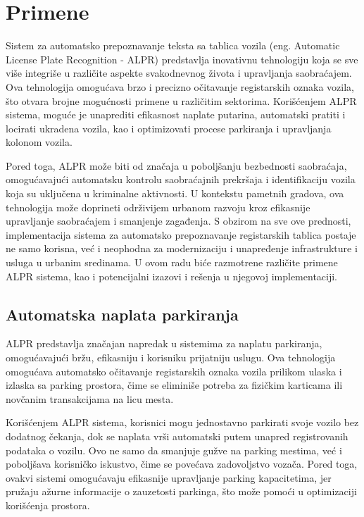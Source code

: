 \documentclass[a4paper,12pt]{article}
\begin{document}
	\section{Primene}
	Sistem za automatsko prepoznavanje teksta sa tablica vozila (eng. Automatic License Plate Recognition - ALPR) predstavlja inovativnu tehnologiju koja se sve više integriše u različite aspekte svakodnevnog života i upravljanja saobraćajem. Ova tehnologija omogućava brzo i precizno očitavanje registarskih oznaka vozila, što otvara brojne mogućnosti primene u različitim sektorima. Korišćenjem ALPR sistema, moguće je unaprediti efikasnost naplate putarina, automatski pratiti i locirati ukradena vozila, kao i optimizovati procese parkiranja i upravljanja kolonom vozila.
	
	Pored toga, ALPR može biti od značaja u poboljšanju bezbednosti saobraćaja, omogućavajući automatsku kontrolu saobraćajnih prekršaja i identifikaciju vozila koja su uključena u kriminalne aktivnosti. U kontekstu pametnih gradova, ova tehnologija može doprineti održivijem urbanom razvoju kroz efikasnije upravljanje saobraćajem i smanjenje zagađenja. S obzirom na sve ove prednosti, implementacija sistema za automatsko prepoznavanje registarskih tablica postaje ne samo korisna, već i neophodna za modernizaciju i unapređenje infrastrukture i usluga u urbanim sredinama. U ovom radu biće razmotrene različite primene ALPR sistema, kao i potencijalni izazovi i rešenja u njegovoj implementaciji.
	
	\subsection{Automatska naplata parkiranja}
	ALPR predstavlja značajan napredak u sistemima za naplatu parkiranja, omogućavajući bržu, efikasniju i korisniku prijatniju uslugu. Ova tehnologija omogućava automatsko očitavanje registarskih oznaka vozila prilikom ulaska i izlaska sa parking prostora, čime se eliminiše potreba za fizičkim karticama ili novčanim transakcijama na licu mesta.
	
	Korišćenjem ALPR sistema, korisnici mogu jednostavno parkirati svoje vozilo bez dodatnog čekanja, dok se naplata vrši automatski putem unapred registrovanih podataka o vozilu. Ovo ne samo da smanjuje gužve na parking mestima, već i poboljšava korisničko iskustvo, čime se povećava zadovoljstvo vozača. Pored toga, ovakvi sistemi omogućavaju efikasnije upravljanje parking kapacitetima, jer pružaju ažurne informacije o zauzetosti parkinga, što može pomoći u optimizaciji korišćenja prostora.
	
\end{document}
